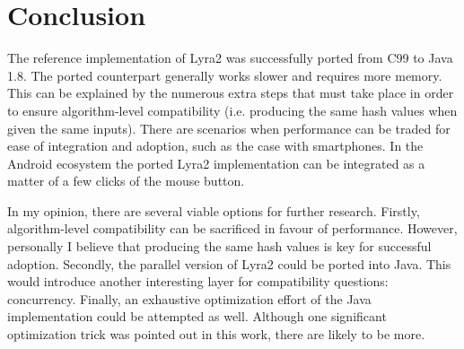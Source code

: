 \chapter{Conclusion}
\label{sec:conclusion}

The reference implementation of Lyra2 was successfully ported from C99 to Java 1.8. The ported counterpart generally works slower and requires more memory. This can be explained by the numerous extra steps that must take place in order to ensure algorithm-level compatibility (i.e. producing the same hash values when given the same inputs). There are scenarios when performance can be traded for ease of integration and adoption, such as the case with smartphones. In the Android ecosystem the ported Lyra2 implementation can be integrated as a matter of a few clicks of the mouse button.

In my opinion, there are several viable options for further research. Firstly, algorithm-level compatibility can be sacrificed in favour of performance. However, personally I believe that producing the same hash values is key for successful adoption. Secondly, the parallel version of Lyra2 could be ported into Java. This would introduce another interesting layer for compatibility questions: concurrency. Finally, an exhaustive optimization effort of the Java implementation could be attempted as well. Although one significant optimization trick was pointed out in this work, there are likely to be more.
